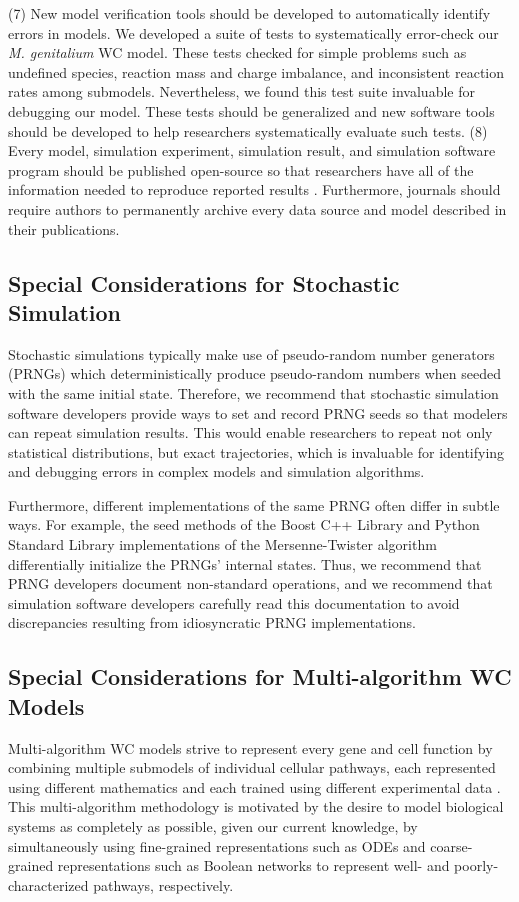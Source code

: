 \documentclass[journal,transmag,twoside]{IEEEtran}
\begin{document}
(7) New model verification tools should be developed to automatically identify errors in models. We developed a suite of tests to systematically error-check our \textit{M. genitalium} WC model. These tests checked for simple problems such as undefined species, reaction mass and charge imbalance, and inconsistent reaction rates among submodels. Nevertheless, we found this test suite invaluable for debugging our model. These tests should be generalized and new software tools should be developed to help researchers systematically evaluate such tests. (8) Every model, simulation experiment, simulation result, and simulation software program should be published open-source so that researchers have all of the information needed to reproduce reported results \cite{easterbrook2014open}. Furthermore, journals should require authors to permanently archive every data source and model described in their publications.

\subsection{Special Considerations for Stochastic Simulation}
Stochastic simulations typically make use of pseudo-random number generators (PRNGs) which deterministically produce pseudo-random numbers when seeded with the same initial state. Therefore, we recommend that stochastic simulation software developers provide ways to set and record PRNG seeds so that modelers can repeat simulation results. This would enable researchers to repeat not only statistical distributions, but exact trajectories, which is invaluable for identifying and debugging errors in complex models and simulation algorithms.

Furthermore, different implementations of the same PRNG often differ in subtle ways. For example, the seed methods of the Boost C++ Library \cite{schaling2011boost} and Python Standard Library implementations of the Mersenne-Twister algorithm differentially initialize the PRNGs' internal states. Thus, we recommend that PRNG developers document non-standard operations, and we recommend that simulation software developers carefully read this documentation to avoid discrepancies resulting from idiosyncratic PRNG implementations.

\subsection{Special Considerations for Multi-algorithm WC Models}
Multi-algorithm WC models strive to represent every gene and cell function by combining multiple submodels of individual cellular pathways, each represented using different mathematics and each trained using different experimental data \cite{Karr2015, macklin2014future, carrera2015build}. This multi-algorithm methodology is motivated by the desire to model biological systems as completely as possible, given our current knowledge, by simultaneously using fine-grained representations such as ODEs and coarse-grained representations such as Boolean networks to represent well- and poorly-characterized pathways, respectively. 
\end{document}
